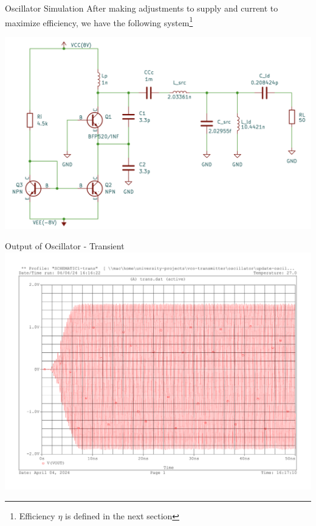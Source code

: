 \documentclass{beamer}
\begin{document}
\begin{frame}{Oscillator Simulation}
  After making adjustments to supply and current to maximize efficiency, we have the following system\footnote{Efficiency \(\eta\) is defined in the next section}
  \begin{center}
    \includegraphics[width=0.85\linewidth]{images/Full_system.png}
  \end{center}
\end{frame}


\begin{frame}{Output of Oscillator - Transient}
\includegraphics[width=\linewidth]{images/osc_out.pdf}

\end{frame}
\end{document}
